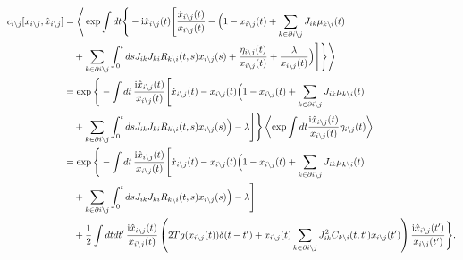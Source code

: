 \documentclass[
    preprint,
    linenumbers,
    amsmath,amssymb,amsfonts,
    aps, physrev,
    superscriptaddress,
    10pt,
    bibnotes
    ]{revtex4-2}
\begin{document}
\begin{subequations}
  \begin{align}
    c_{i\setminus j}[x_{i\setminus j},\hat{x}_{i\setminus j}] &= \Bigg\langle\exp \int dt \Bigg\{-{\rm i}\hat{x}_{i\setminus j}(t)\Bigg[\frac{\dot{x}_{i\setminus j}(t)}{x_{i\setminus j}(t)}-\Big(1-x_{i\setminus j}(t)+\sum_{k\in\partial i\setminus j}J_{ik}\mu_{k\setminus i}(t)\nonumber \\
    &\quad + \sum_{k\in\partial i\setminus j}\int_{0}^{t}dsJ_{ik}J_{ki}R_{k\setminus i}(t,s)x_{i\setminus j}(s) + \frac{\eta_{i\setminus j}(t)}{x_{i\setminus j}(t)} + \frac{\lambda}{x_{i\setminus j}(t)} \Big)\Bigg]\Bigg\}\Bigg\rangle\\
    &= \exp \Bigg\{-\int dt\, \frac{{\rm i}\hat{x}_{i\setminus j}(t)}{x_{i\setminus j}(t)}\Bigg[\dot{x}_{i\setminus j}(t)-x_{i\setminus j}(t)\Big(1-x_{i\setminus j}(t)+\sum_{k\in\partial i\setminus j}J_{ik}\mu_{k\setminus i}(t)\nonumber \\
    &\quad + \sum_{k\in\partial i\setminus j}\int_{0}^{t}dsJ_{ik}J_{ki}R_{k\setminus i}(t,s)x_{i\setminus j}(s)\Big) - \lambda\Bigg] \Bigg\} \left \langle \exp \int dt \frac{{\rm i}\hat{x}_{i\setminus j}(t)}{x_{i\setminus j}(t)} \eta_{i\setminus j}(t)\right \rangle\\
    &= \exp \Bigg\{-\int dt\, \frac{{\rm i}\hat{x}_{i\setminus j}(t)}{x_{i\setminus j}(t)}\Bigg[\dot{x}_{i\setminus j}(t)-x_{i\setminus j}(t)\Big(1-x_{i\setminus j}(t)+\sum_{k\in\partial i\setminus j}J_{ik}\mu_{k\setminus i}(t)\nonumber \\
    &\quad + \sum_{k\in\partial i\setminus j}\int_{0}^{t}dsJ_{ik}J_{ki}R_{k\setminus i}(t,s)x_{i\setminus j}(s)\Big) - \lambda\Bigg] \nonumber\\
    &\quad + \frac{1}{2} \int dt dt' \, \frac{{\rm i}\hat{x}_{i\setminus j}(t)}{x_{i\setminus j}(t)}\left(2T g(x_{i\setminus j}(t))\delta(t-t')+x_{i\setminus j}(t)\sum_{k\in \partial i \setminus j}J_{ik}^2 C_{k\setminus i}(t,t') x_{i\setminus j}(t')\right)\frac{{\rm i}\hat{x}_{i\setminus j}(t')}{x_{i\setminus j}(t')}\Bigg\}.
  \end{align}
\end{subequations}
\end{document}
